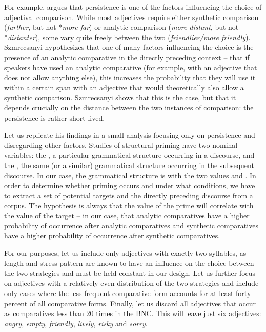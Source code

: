 For example, \citet{szmrecsanyi_language_2005} argues that persistence is one of the factors influencing the choice of adjectival comparison. While most adjectives require either synthetic comparison (\textit{further}, but not *\textit{more far}) or analytic comparison (\textit{more distant}, but not *\textit{distanter}), some vary quite freely between the two (\textit{friendlier/more friendly}). Szmrecsanyi hypothesizes that one of many factors influencing the choice is the presence of an analytic comparative in the directly preceding context -- that if speakers have used an analytic comparative (for example, with an adjective that does not allow anything else), this increases the probability that they will use it within a certain span with an adjective that would theoretically also allow a synthetic comparison. Szmrecsanyi shows that this is the case, but that it depends crucially on the distance between the two instances of comparison: the persistence is rather short-lived.

Let us replicate his findings in a small analysis focusing only on persistence and disregarding other factors. Studies of structural priming have two nominal variables: the , a particular grammatical structure occurring in a discourse, and the , the same (or a similar) grammatical structure occurring in the subsequent discourse. In our case, the grammatical structure is  with the two values  and . In order to determine whether priming occurs and under what conditions, we have to extract a set of potential targets and the directly preceding discourse from a corpus. The hypothesis is always that the value of the prime will correlate with the value of the target -- in our case, that analytic comparatives have a higher probability of occurrence after analytic comparatives and synthetic comparatives have a higher probability of occurrence after synthetic comparatives.

For our purposes, let us include only adjectives with exactly two syllables, as length and stress pattern are known to have an influence on the choice between the two strategies and must be held constant in our design. Let us further focus on adjectives with a relatively even distribution of the two strategies and include only cases where the less frequent comparative form accounts for at least forty percent of all comparative forms. Finally, let us discard all adjectives that occur as comparatives less than 20 times in the BNC. This will leave just six adjectives: \textit{angry}, \textit{empty}, \textit{friendly}, \textit{lively}, \textit{risky} and \textit{sorry}.

